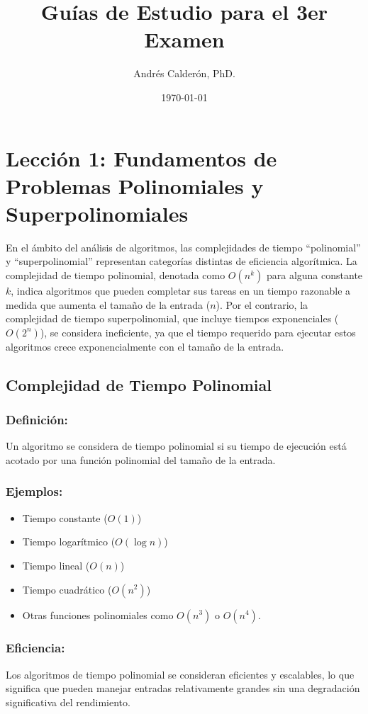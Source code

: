 \documentclass[letter, 12pt]{article}
\title{Guías de Estudio para el 3er Examen}
\author{Andrés Calderón, PhD.}
\date{\today}
\begin{document}
    \maketitle

    \section{Lección 1: Fundamentos de Problemas Polinomiales y Superpolinomiales}

    En el ámbito del análisis de algoritmos, las complejidades de tiempo ``polinomial'' y ``superpolinomial'' representan categorías distintas de eficiencia algorítmica. La complejidad de tiempo polinomial, denotada como $O(n^k)$ para alguna constante $k$, indica algoritmos que pueden completar sus tareas en un tiempo razonable a medida que aumenta el tamaño de la entrada ($n$). Por el contrario, la complejidad de tiempo superpolinomial, que incluye tiempos exponenciales ($O(2^n)$), se considera ineficiente, ya que el tiempo requerido para ejecutar estos algoritmos crece exponencialmente con el tamaño de la entrada.

    \subsection{Complejidad de Tiempo Polinomial}

    \subsubsection{Definición:}
    Un algoritmo se considera de tiempo polinomial si su tiempo de ejecución está acotado por una función polinomial del tamaño de la entrada.

    \subsubsection{Ejemplos:}
    \begin{itemize}
        \item Tiempo constante ($O(1)$)
        \item Tiempo logarítmico ($O(\log n)$)
        \item Tiempo lineal ($O(n)$)
        \item Tiempo cuadrático ($O(n^2)$)
        \item Otras funciones polinomiales como $O(n^3)$ o $O(n^4)$.
    \end{itemize}

    \subsubsection{Eficiencia:}
    Los algoritmos de tiempo polinomial se consideran eficientes y escalables, lo que significa que pueden manejar entradas relativamente grandes sin una degradación significativa del rendimiento.
\end{document}
